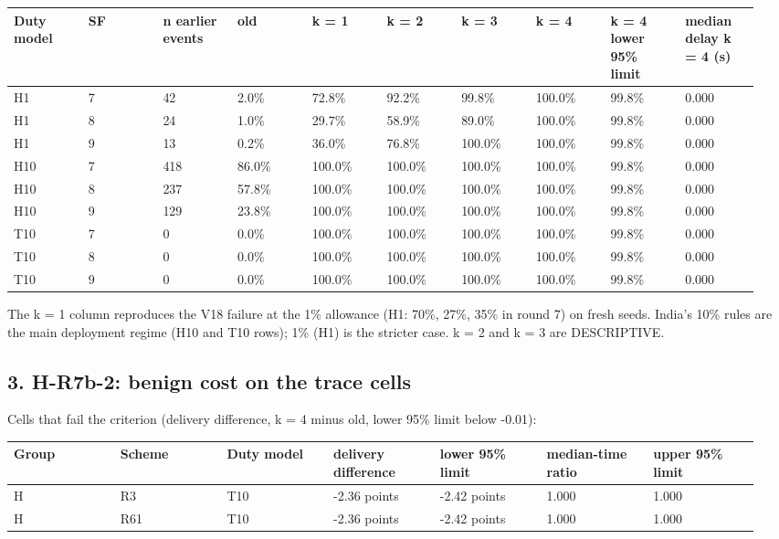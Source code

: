 {\scriptsize\raggedright
\begin{longtable}{p{0.095\linewidth}p{0.095\linewidth}p{0.095\linewidth}p{0.095\linewidth}p{0.095\linewidth}p{0.095\linewidth}p{0.095\linewidth}p{0.095\linewidth}p{0.095\linewidth}p{0.095\linewidth}}
\toprule
Duty model & SF & n earlier events & old & k = 1 & k = 2 & k = 3 & k = 4 & k = 4 lower 95\% limit & median delay k = 4 (s) \\
\midrule
\endhead
H1 & 7 & 42 & 2.0\% & 72.8\% & 92.2\% & 99.8\% & 100.0\% & 99.8\% & 0.000 \\
H1 & 8 & 24 & 1.0\% & 29.7\% & 58.9\% & 89.0\% & 100.0\% & 99.8\% & 0.000 \\
H1 & 9 & 13 & 0.2\% & 36.0\% & 76.8\% & 100.0\% & 100.0\% & 99.8\% & 0.000 \\
H10 & 7 & 418 & 86.0\% & 100.0\% & 100.0\% & 100.0\% & 100.0\% & 99.8\% & 0.000 \\
H10 & 8 & 237 & 57.8\% & 100.0\% & 100.0\% & 100.0\% & 100.0\% & 99.8\% & 0.000 \\
H10 & 9 & 129 & 23.8\% & 100.0\% & 100.0\% & 100.0\% & 100.0\% & 99.8\% & 0.000 \\
T10 & 7 & 0 & 0.0\% & 100.0\% & 100.0\% & 100.0\% & 100.0\% & 99.8\% & 0.000 \\
T10 & 8 & 0 & 0.0\% & 100.0\% & 100.0\% & 100.0\% & 100.0\% & 99.8\% & 0.000 \\
T10 & 9 & 0 & 0.0\% & 100.0\% & 100.0\% & 100.0\% & 100.0\% & 99.8\% & 0.000 \\
\bottomrule
\end{longtable}}

The k = 1 column reproduces the V18 failure at the 1\% allowance (H1: 70\%, 27\%, 35\% in round 7) on fresh seeds. India's 10\% rules are the main deployment regime (H10 and T10 rows); 1\% (H1) is the stricter case. k = 2 and k = 3 are DESCRIPTIVE.

\subsection*{3. H-R7b-2: benign cost on the trace cells}

Cells that fail the criterion (delivery difference, k = 4 minus old, lower 95\% limit below -0.01):

{\scriptsize\raggedright
\begin{longtable}{p{0.136\linewidth}p{0.136\linewidth}p{0.136\linewidth}p{0.136\linewidth}p{0.136\linewidth}p{0.136\linewidth}p{0.136\linewidth}}
\toprule
Group & Scheme & Duty model & delivery difference & lower 95\% limit & median-time ratio & upper 95\% limit \\
\midrule
\endhead
H & R3 & T10 & -2.36 points & -2.42 points & 1.000 & 1.000 \\
H & R61 & T10 & -2.36 points & -2.42 points & 1.000 & 1.000 \\
\bottomrule
\end{longtable}}


